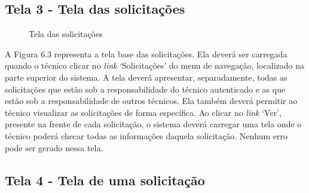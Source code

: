 \newpage

\subsection{Tela 3 - Tela das solicitações}

\begin{figure}[ht]
    \centering
    \caption{Tela das solicitações}
\end{figure}

A Figura 6.3 representa a tela base das solicitações. Ela deverá ser carregada quando o técnico clicar no \textit{link} ‘Solicitações’ do menu de navegação, localizado na parte superior do sistema. A tela deverá apresentar, separadamente, todas as solicitações que estão sob a responsabilidade do técnico autenticado e as que estão sob a responsabilidade de outros técnicos. Ela também deverá permitir ao técnico visualizar as solicitações de forma específica. Ao clicar no \textit{link} ‘Ver’, presente na frente de cada solicitação, o sistema deverá carregar uma tela onde o técnico poderá checar todas as informações daquela solicitação. Nenhum erro pode ser gerado nessa tela.

\newpage

\subsection{Tela 4 - Tela de uma solicitação}

